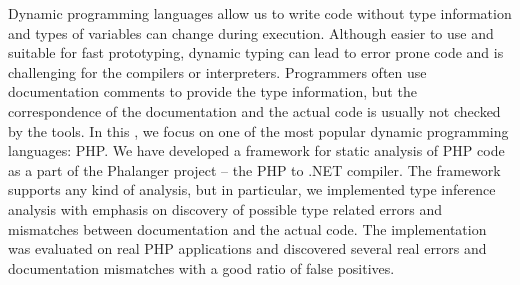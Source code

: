 Dynamic programming languages allow us to write code without type 
information and types of variables can change during execution. 
Although easier to use and suitable for fast prototyping, 
dynamic typing can lead to error prone code and is challenging 
for the compilers or interpreters.
Programmers often use documentation comments to provide 
the type information, but the correspondence of the 
documentation and the actual code is usually not checked 
by the tools. In this \wthesis, we focus on one of the most popular dynamic 
programming languages: PHP. We have developed a framework 
for static analysis of PHP code as a part of the Phalanger project -- 
the PHP to .NET compiler. The framework supports any kind of analysis, 
but in particular, we implemented type inference analysis with emphasis 
on discovery of possible type related errors and mismatches between 
documentation and the actual code. The implementation was evaluated 
on real PHP applications and discovered several real errors and 
documentation mismatches with a good ratio of false positives.